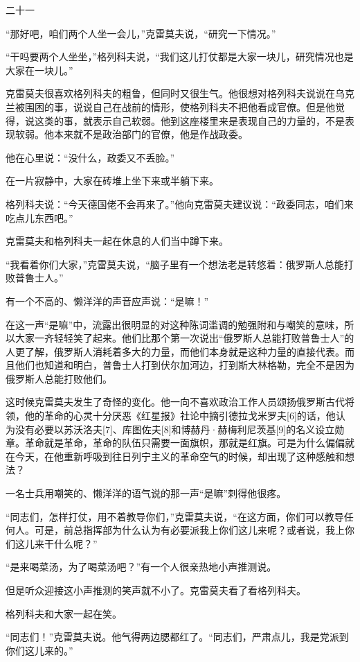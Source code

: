 二十一

“那好吧，咱们两个人坐一会儿，”克雷莫夫说，“研究一下情况。”

“干吗要两个人坐坐，”格列科夫说，“我们这儿打仗都是大家一块儿，研究情况也是大家在一块儿。”

克雷莫夫很喜欢格列科夫的粗鲁，但同时又很生气。他很想对格列科夫说说在乌克兰被围困的事，说说自己在战前的情形，使格列科夫不把他看成官僚。但是他觉得，说这类的事，就表示自己软弱。他到这座楼里来是表现自己的力量的，不是表现软弱。他本来就不是政治部门的官僚，他是作战政委。

他在心里说：“没什么，政委又不丢脸。”

在一片寂静中，大家在砖堆上坐下来或半躺下来。

格列科夫说：“今天德国佬不会再来了。”他向克雷莫夫建议说：“政委同志，咱们来吃点儿东西吧。”

克雷莫夫和格列科夫一起在休息的人们当中蹲下来。

“我看着你们大家，”克雷莫夫说，“脑子里有一个想法老是转悠着：俄罗斯人总能打败普鲁士人。”

有一个不高的、懒洋洋的声音应声说：“是嘛！”

在这一声“是嘛”中，流露出很明显的对这种陈词滥调的勉强附和与嘲笑的意味，所以大家一齐轻轻笑了起来。他们比那个第一次说出“俄罗斯人总能打败普鲁士人”的人更了解，俄罗斯人消耗着多大的力量，而他们本身就是这种力量的直接代表。而且他们也知道和明白，普鲁士人打到伏尔加河边，打到斯大林格勒，完全不是因为俄罗斯人总能打败他们。

这时候克雷莫夫发生了奇怪的变化。他一向不喜欢政治工作人员颂扬俄罗斯古代将领，他的革命的心灵十分厌恶《红星报》社论中摘引德拉戈米罗夫[6]的话，他认为没有必要以苏沃洛夫[7]、库图佐夫[8]和博赫丹·赫梅利尼茨基[9]的名义设立勋章。革命就是革命，革命的队伍只需要一面旗帜，那就是红旗。可是为什么偏偏就在今天，在他重新呼吸到往日列宁主义的革命空气的时候，却出现了这种感触和想法？

一名士兵用嘲笑的、懒洋洋的语气说的那一声“是嘛”刺得他很疼。

“同志们，怎样打仗，用不着教导你们，”克雷莫夫说，“在这方面，你们可以教导任何人。可是，前总指挥部为什么认为有必要派我上你们这儿来呢？或者说，我上你们这儿来干什么呢？”

“是来喝菜汤，为了喝菜汤吧？”有一个人很亲热地小声推测说。

但是听众迎接这小声推测的笑声就不小了。克雷莫夫看了看格列科夫。

格列科夫和大家一起在笑。

“同志们！”克雷莫夫说。他气得两边腮都红了。“同志们，严肃点儿，我是党派到你们这儿来的。”

